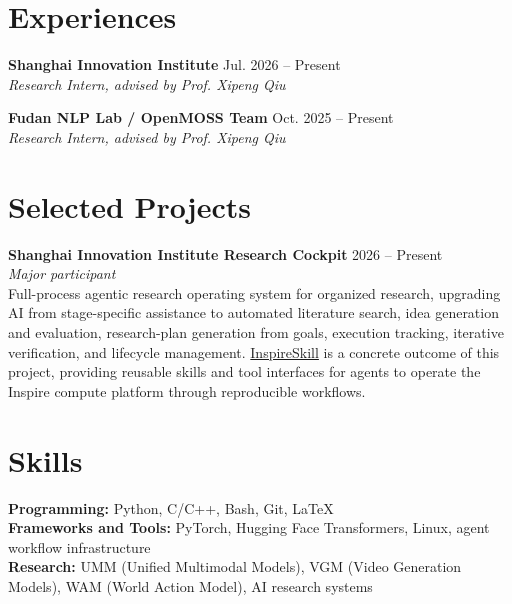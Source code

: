 \documentclass[10pt,letterpaper]{article}
\newcommand{\entry}[4]{
  \textbf{#1} \hfill #2\\
  \textit{#3}\\
  #4
}
\newcommand{\smallentry}[3]{
  \textbf{#1} \hfill #2\\
  \textit{#3}
}
\begin{document}
\section*{Experiences}
\smallentry{Shanghai Innovation Institute}{Jul. 2026 -- Present}
{Research Intern, advised by Prof. Xipeng Qiu}

\vspace{5pt}
\smallentry{Fudan NLP Lab / OpenMOSS Team}{Oct. 2025 -- Present}
{Research Intern, advised by Prof. Xipeng Qiu}

\section*{Selected Projects}
\entry{Shanghai Innovation Institute Research Cockpit}{2026 -- Present}
{Major participant}
{Full-process agentic research operating system for organized research, upgrading AI from stage-specific assistance to automated literature search, idea generation and evaluation, research-plan generation from goals, execution tracking, iterative verification, and lifecycle management. \href{https://github.com/realZillionX/InspireSkill}{InspireSkill} is a concrete outcome of this project, providing reusable skills and tool interfaces for agents to operate the Inspire compute platform through reproducible workflows.}

\section*{Skills}
\textbf{Programming:} Python, C/C++, Bash, Git, \LaTeX\\
\textbf{Frameworks and Tools:} PyTorch, Hugging Face Transformers, Linux, agent workflow infrastructure\\
\textbf{Research:} UMM (Unified Multimodal Models), VGM (Video Generation Models), WAM (World Action Model), AI research systems
\end{document}
